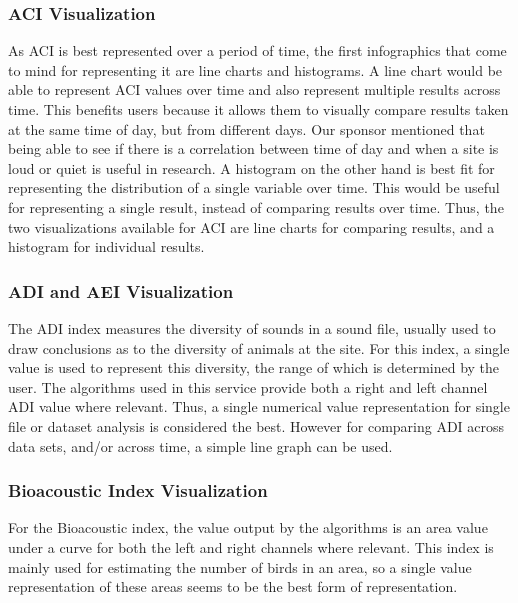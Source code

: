 \subsubsection{ACI Visualization}
As ACI is best represented over a period of time, the first infographics that come to mind for representing it are line charts and histograms. A line chart would be able to represent ACI values over time and also represent multiple results across time. This benefits users because it allows them to visually compare results taken at the same time of day, but from different days. Our sponsor mentioned that being able to see if there is a correlation between time of day and when a site is loud or quiet is useful in research. A histogram on the other hand is best fit for representing the distribution of a single variable over time. This would be useful for representing a single result, instead of comparing results over time. Thus, the two visualizations available for ACI are line charts for comparing results, and a histogram for individual results.

\subsubsection{ADI and AEI Visualization}
The ADI index measures the diversity of sounds in a sound file, usually used to draw conclusions as to the diversity of animals at the site. For this index, a single value is used to represent this diversity, the range of which is determined by the user. The algorithms used in this service provide both a right and left channel ADI value where relevant. Thus, a single numerical value representation for single file or dataset analysis is considered the best. However for comparing ADI across data sets, and/or across time, a simple line graph can be used.

\subsubsection{Bioacoustic Index Visualization}
For the Bioacoustic index, the value output by the algorithms is an area value under a curve for both the left and right channels where relevant. This index is mainly used for estimating the number of birds in an area, so a single value representation of these areas seems to be the best form of representation.
